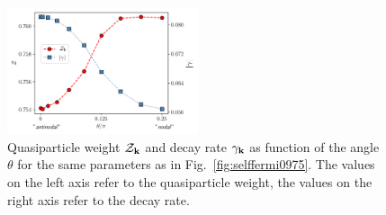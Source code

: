 

\begin{figure}
\includegraphics[width=0.5\textwidth]{images/z_and_gamma975.png}
\caption{Quasiparticle weight $\mathcal{Z}_{\mathbf{k} }$ and decay rate $\gamma_{\bf{k}}$ as function of the angle $\theta$ for the same parameters as in Fig.~\ref{fig:selffermi0975}. 
The values on the left axis refer to the quasiparticle weight, the values on the right axis refer to the decay rate.}
\label{fig:zetaandgamma}
\end{figure}
